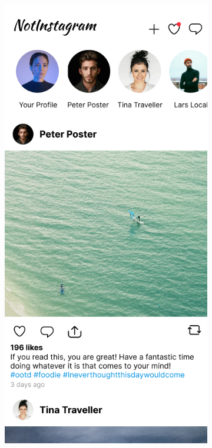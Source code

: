 \documentclass[a4paper, 12pt]{article}
\begin{document}
\begin{figure}[h]
  \begin{subfigure}{0.24\linewidth}
    \begin{center}
      \includegraphics[width=\linewidth, height=0.3\textheight, keepaspectratio,frame]{img/ig-clone/Feed.png}

\end{center}
\end{subfigure}
\end{figure}
\end{document}
